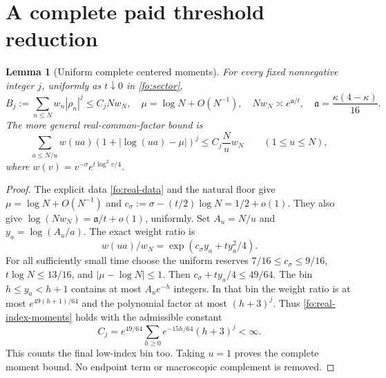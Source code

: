 \documentclass[11pt]{article}
\numberwithin{equation}{section}
\newtheorem{lemma}[theorem]{Lemma}
\theoremstyle{definition}
\theoremstyle{remark}
\begin{document}
\section{A complete paid threshold reduction}
\label{fo:threshold-section}

\begin{lemma}[Uniform complete centered moments]
\label{fo:moment-lemma}
For every fixed nonnegative integer $j$, uniformly as $t\downarrow0$
in \eqref{fo:sector},
\begin{equation}
B_j:=\sum_{n\le N}w_n|\rho_n|^j\le C_jNw_N,
\quad \mu=\log N+O(N^{-1}),\quad
Nw_N\asymp e^{\mathfrak a/t},\quad
\mathfrak a=\frac{\kappa(4-\kappa)}{16}.
\label{fo:moment-bounds}
\end{equation}
The more general real-common-factor bound is
\begin{equation}
\sum_{a\le N/u}w(ua)(1+|\log(ua)-\mu|)^j
 \le C_j\frac Nu w_N\qquad(1\le u\le N),
\label{fo:real-index-moments}
\end{equation}
where $w(v)=v^{-\sigma}e^{t\log^2v/4}$.
\end{lemma}
\begin{proof}
The explicit data \eqref{fo:real-data} and the natural floor give
$\mu=\log N+O(N^{-1})$ and
$c_\sigma:=\sigma-(t/2)\log N=1/2+o(1)$.  They also give
$\log(Nw_N)=\mathfrak a/t+o(1)$, uniformly.  Set $A_u=N/u$ and
$y_a=\log(A_u/a)$.  The exact weight ratio is
\begin{equation}
w(ua)/w_N=\exp(c_\sigma y_a+t y_a^2/4).
\label{fo:weight-distance}
\end{equation}
For all sufficiently small time choose the uniform reserves
$7/16\le c_\sigma\le9/16$, $t\log N\le13/16$, and
$|\mu-\log N|\le1$.  Then
$c_\sigma+ty_a/4\le49/64$.  The bin $h\le y_a<h+1$ contains at
most $A_ue^{-h}$ integers.  In that bin the weight ratio is at most
$e^{49(h+1)/64}$ and the polynomial factor at most $(h+3)^j$.
Thus \eqref{fo:real-index-moments} holds with the admissible constant
\begin{equation}
C_j=e^{49/64}\sum_{h\ge0}e^{-15h/64}(h+3)^j<\infty.
\end{equation}
This counts the final low-index bin too.  Taking $u=1$ proves the
complete moment bound.  No endpoint term or macroscopic complement is
removed.
\end{proof}
\end{document}
